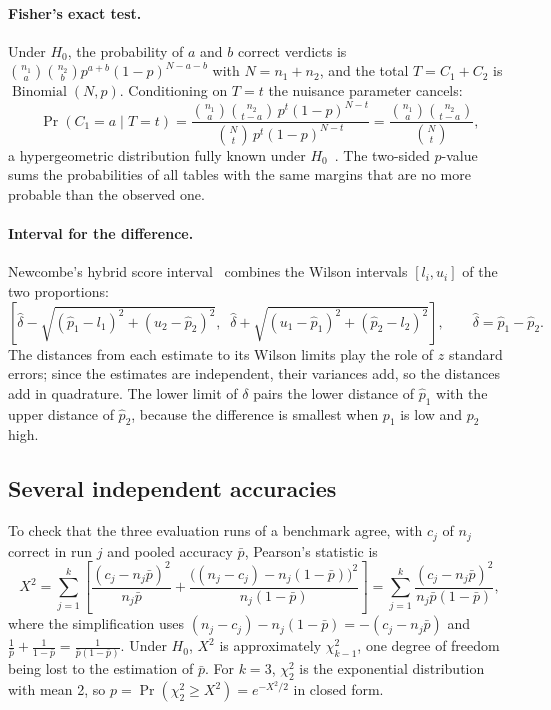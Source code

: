 \paragraph{Fisher's exact test.} Under $H_0$, the probability of $a$ and $b$ correct verdicts is $\binom{n_1}{a}\binom{n_2}{b} p^{a+b}(1-p)^{N-a-b}$ with $N = n_1 + n_2$, and the total $T = C_1 + C_2$ is $\operatorname{Binomial}(N, p)$. Conditioning on $T = t$ the nuisance parameter cancels:
\begin{equation}
  \Pr(C_1 = a \mid T = t) = \frac{\binom{n_1}{a}\binom{n_2}{t-a}\, p^t (1-p)^{N-t}}{\binom{N}{t}\, p^t (1-p)^{N-t}} = \frac{\binom{n_1}{a}\binom{n_2}{t-a}}{\binom{N}{t}},
\end{equation}
a hypergeometric distribution fully known under $H_0$~\citep{fisher1922interpretation}. The two-sided $p$-value sums the probabilities of all tables with the same margins that are no more probable than the observed one.

\paragraph{Interval for the difference.} Newcombe's hybrid score interval~\citep{newcombe1998interval} combines the Wilson intervals $[l_i, u_i]$ of the two proportions:
\begin{equation}
  \left[ \hat{\delta} - \sqrt{(\hat{p}_1 - l_1)^2 + (u_2 - \hat{p}_2)^2},\;\; \hat{\delta} + \sqrt{(u_1 - \hat{p}_1)^2 + (\hat{p}_2 - l_2)^2} \right], \qquad \hat{\delta} = \hat{p}_1 - \hat{p}_2 .
\end{equation}
The distances from each estimate to its Wilson limits play the role of $z$ standard errors; since the estimates are independent, their variances add, so the distances add in quadrature. The lower limit of $\delta$ pairs the lower distance of $\hat{p}_1$ with the upper distance of $\hat{p}_2$, because the difference is smallest when $p_1$ is low and $p_2$ high.

\subsection{Several independent accuracies}

To check that the three evaluation runs of a benchmark agree, with $c_j$ of $n_j$ correct in run $j$ and pooled accuracy $\bar{p}$, Pearson's statistic is
\begin{equation}
  X^2 = \sum_{j=1}^{k} \left[ \frac{(c_j - n_j \bar{p})^2}{n_j \bar{p}} + \frac{\bigl((n_j - c_j) - n_j(1-\bar{p})\bigr)^2}{n_j(1-\bar{p})} \right] = \sum_{j=1}^{k} \frac{(c_j - n_j \bar{p})^2}{n_j \bar{p}(1-\bar{p})},
\end{equation}
where the simplification uses $(n_j - c_j) - n_j(1 - \bar{p}) = -(c_j - n_j\bar{p})$ and $\frac{1}{\bar{p}} + \frac{1}{1-\bar{p}} = \frac{1}{\bar{p}(1-\bar{p})}$. Under $H_0$, $X^2$ is approximately $\chi^2_{k-1}$, one degree of freedom being lost to the estimation of $\bar{p}$. For $k = 3$, $\chi^2_2$ is the exponential distribution with mean 2, so $p = \Pr(\chi^2_2 \ge X^2) = e^{-X^2/2}$ in closed form.

